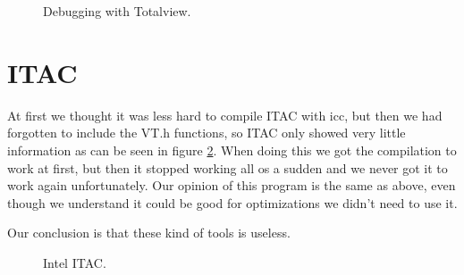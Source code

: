 \documentclass[titlepage, a4paper]{article}
\begin{document}
\begin{figure}[H]
  \centering
  \caption{Debugging with Totalview.}
  \label{fig:totalview}
\end{figure}


\section{ITAC}
At first we thought it was less hard to compile ITAC with icc, but then we had forgotten to include the VT.h functions, so ITAC only showed very little information as can be seen in figure \ref{fig:itac}. When doing this we got the compilation to work at first, but then it stopped working all os a sudden and we never got it to work again unfortunately. Our opinion of this program is the same as above, even though we understand it could be good for optimizations we didn't need to use it.

Our conclusion is that these kind of tools is useless.


\begin{figure}[H]
  \centering
  \caption{Intel ITAC.}
  \label{fig:itac}
\end{figure}
\end{document}
